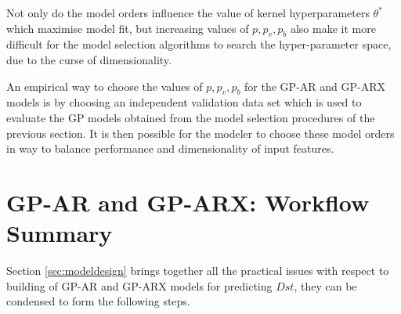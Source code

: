 \documentclass{article}
\begin{document}
Not only do the model orders influence the value of kernel
hyperparameters $\theta^*$ which maximise model fit, but increasing
values of $p, p_v, p_b$ also make it more difficult for the model
selection algorithms to search the hyper-parameter space, due to the
curse of dimensionality.

An empirical way to choose the values of $p, p_v, p_b$ for the GP-AR
and GP-ARX models is by choosing an independent validation data set
which is used to evaluate the GP models obtained from the model
selection procedures of the previous section. It is then possible for
the modeler to choose these model orders in way to balance performance
and dimensionality of input features.

\section{GP-AR and GP-ARX: Workflow Summary}\label{sec:workflow}

Section \ref{sec:modeldesign} brings together all the practical issues
with respect to building of GP-AR and GP-ARX models for predicting
$Dst$, they can be condensed to form the following steps.
\end{document}
